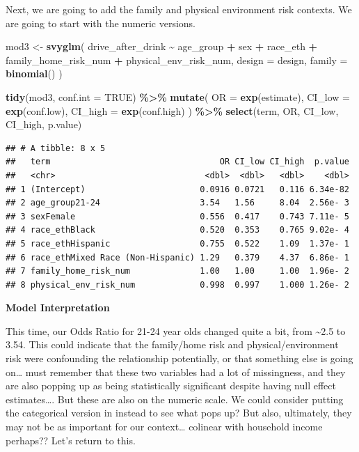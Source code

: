 \documentclass[
]{article}
\newenvironment{Shaded}{\begin{snugshade}}{\end{snugshade}}
\newcommand{\AttributeTok}[1]{\textcolor[rgb]{0.13,0.29,0.53}{#1}}
\newcommand{\ConstantTok}[1]{\textcolor[rgb]{0.56,0.35,0.01}{#1}}
\newcommand{\FunctionTok}[1]{\textcolor[rgb]{0.13,0.29,0.53}{\textbf{#1}}}
\newcommand{\NormalTok}[1]{#1}
\newcommand{\OtherTok}[1]{\textcolor[rgb]{0.56,0.35,0.01}{#1}}
\newcommand{\SpecialCharTok}[1]{\textcolor[rgb]{0.81,0.36,0.00}{\textbf{#1}}}
\begin{document}
Next, we are going to add the family and physical environment risk
contexts. We are going to start with the numeric versions.

\begin{Shaded}
\begin{Highlighting}[]
\NormalTok{mod3 }\OtherTok{\textless{}{-}} \FunctionTok{svyglm}\NormalTok{(}
\NormalTok{  drive\_after\_drink }\SpecialCharTok{\textasciitilde{}}\NormalTok{ age\_group }\SpecialCharTok{+}\NormalTok{ sex }\SpecialCharTok{+}\NormalTok{ race\_eth }\SpecialCharTok{+}
\NormalTok{  family\_home\_risk\_num }\SpecialCharTok{+}
\NormalTok{  physical\_env\_risk\_num,}
  \AttributeTok{design =}\NormalTok{ design,}
  \AttributeTok{family =} \FunctionTok{binomial}\NormalTok{()}
\NormalTok{) }

\FunctionTok{tidy}\NormalTok{(mod3, }\AttributeTok{conf.int =} \ConstantTok{TRUE}\NormalTok{) }\SpecialCharTok{\%\textgreater{}\%}
  \FunctionTok{mutate}\NormalTok{(}
    \AttributeTok{OR =} \FunctionTok{exp}\NormalTok{(estimate),}
    \AttributeTok{CI\_low =} \FunctionTok{exp}\NormalTok{(conf.low),}
    \AttributeTok{CI\_high =} \FunctionTok{exp}\NormalTok{(conf.high)}
\NormalTok{  ) }\SpecialCharTok{\%\textgreater{}\%}
  \FunctionTok{select}\NormalTok{(term, OR, CI\_low, CI\_high, p.value)}
\end{Highlighting}
\end{Shaded}

\begin{verbatim}
## # A tibble: 8 x 5
##   term                                  OR CI_low CI_high  p.value
##   <chr>                              <dbl>  <dbl>   <dbl>    <dbl>
## 1 (Intercept)                       0.0916 0.0721   0.116 6.34e-82
## 2 age_group21-24                    3.54   1.56     8.04  2.56e- 3
## 3 sexFemale                         0.556  0.417    0.743 7.11e- 5
## 4 race_ethBlack                     0.520  0.353    0.765 9.02e- 4
## 5 race_ethHispanic                  0.755  0.522    1.09  1.37e- 1
## 6 race_ethMixed Race (Non-Hispanic) 1.29   0.379    4.37  6.86e- 1
## 7 family_home_risk_num              1.00   1.00     1.00  1.96e- 2
## 8 physical_env_risk_num             0.998  0.997    1.000 1.26e- 2
\end{verbatim}

\textbf{Model Interpretation}

This time, our Odds Ratio for 21-24 year olds changed quite a bit, from
\textasciitilde2.5 to 3.54. This could indicate that the family/home
risk and physical/environment risk were confounding the relationship
potentially, or that something else is going on\ldots{} must remember
that these two variables had a lot of missingness, and they are also
popping up as being statistically significant despite having null effect
estimates\ldots. But these are also on the numeric scale. We could
consider putting the categorical version in instead to see what pops up?
But also, ultimately, they may not be as important for our
context\ldots{} colinear with household income perhaps?? Let's return to
this.
\end{document}
